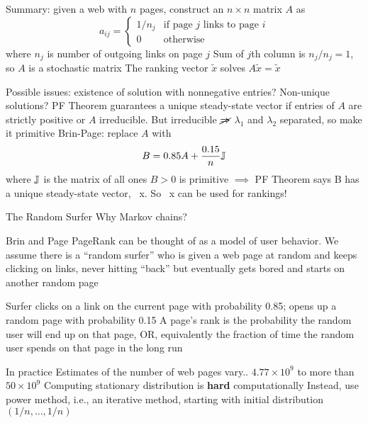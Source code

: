 \documentclass[aspectratio=169]{beamer}\usepackage[]{graphicx}\usepackage[]{xcolor}
\begin{document}
\begin{frame}{}
	Summary: given a web with $n$ pages, construct an $n\times n$ matrix $A$ as
	\[
	a_{ij} =
	\begin{cases}
		1/n_j & \text{if page $j$ links to page $i$} \\
		0 & \text{otherwise}
	\end{cases}
	\]
	where $n_j$ is number of outgoing links on page $j$
	\vfill
	Sum of $j$th column is $n_j/n_j = 1$, so $A$ is a stochastic matrix
	\vfill
	The ranking vector $\tilde x$ solves $A\tilde x = \tilde x$
\end{frame}


\begin{frame}{}
	Possible issues: existence of solution with nonnegative entries? Non-unique solutions?	
	\vfill
	PF Theorem guarantees a unique steady-state vector if entries of $A$ are strictly positive or $A$ irreducible. But irreducible $\cancel{\Rightarrow}$ $\lambda_1$ and $\lambda_2$ separated, so make it primitive
	\vfill
	Brin-Page: replace $A$ with
	\[
		B = 0.85A + \frac{0.15}{n}\mathbb{J}
	\]
	where $\mathbb{J}$ is the matrix of all ones
\vfill
$B>0$ is primitive $\implies$
PF Theorem says B has a unique steady-state vector, ~x.
So ~x can be used for rankings!
\end{frame}

\begin{frame}{The Random Surfer}
	Why Markov chains?
	\vfill
\begin{block}{Brin and Page}
	PageRank can be thought of as a model of user behavior. We assume there is a ``random surfer'' who is given a web page at random and keeps clicking on links, never hitting ``back'' but eventually gets bored and starts on another random page
\end{block}
\vfill
Surfer clicks on a link on the current page with probability 0.85; opens up a random page with probability 0.15
\vfill
A page's rank is the probability the random user will end up on that page, OR, equivalently the fraction of time the random user spends on that page in the long run
\end{frame}


\begin{frame}{In practice}
	Estimates of the number of web pages vary.. $4.77\times 10^9$ to more than $50\times 10^9$
	\vfill 
	Computing stationary distribution is \textbf{hard} computationally
	\vfill
	Instead, use power method, i.e., an iterative method, starting with initial distribution $(1/n,\ldots,1/n)$
\end{frame}
\end{document}
